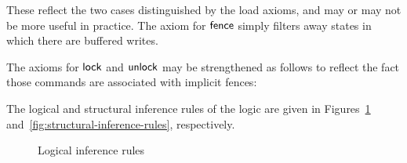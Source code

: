 \documentclass[11pt]{report}
\begin{document}
These reflect the two cases distinguished by the load axioms, and may or may not be more useful in practice. The axiom for $\operatorname{\mathsf{fence}}$ simply filters away states in which there are buffered writes. 

The axioms for $\operatorname{\mathsf{lock}}$ and $\operatorname{\mathsf{unlock}}$ may be strengthened as follows to reflect the fact those commands are associated with implicit fences: 


The logical and structural inference rules of the logic are given in Figures~\ref{fig:logical-inference-rules} and~\ref{fig:structural-inference-rules}, respectively.

\begin{figure}[ht]
	\centering
	\caption{\label{fig:logical-inference-rules}Logical inference rules}
\end{figure}
\end{document}
